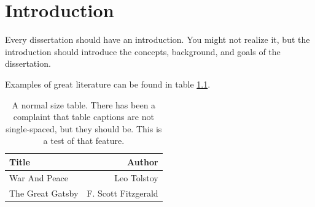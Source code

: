 
\chapter{Introduction}

Every dissertation should have an introduction.  You might not realize
it, but the introduction should introduce the concepts, background,
and goals of the dissertation.

Examples of great literature can be found in table \ref{tab:example-1}.

\begin{table}[htbp]
  \caption[A normal size table.]{A normal size table. There has been a complaint
    that table captions are not single-spaced, but they should be. This is a
    test of that feature.}
  \label{tab:example-1}
  \begin{center}
    \begin{tabular}{|l|r|}
      \hline 
      Title & Author \\
      \hline
      War And Peace & Leo Tolstoy \\
      The Great Gatsby & F. Scott Fitzgerald \\ \hline
    \end{tabular}
  \end{center}
\end{table}

